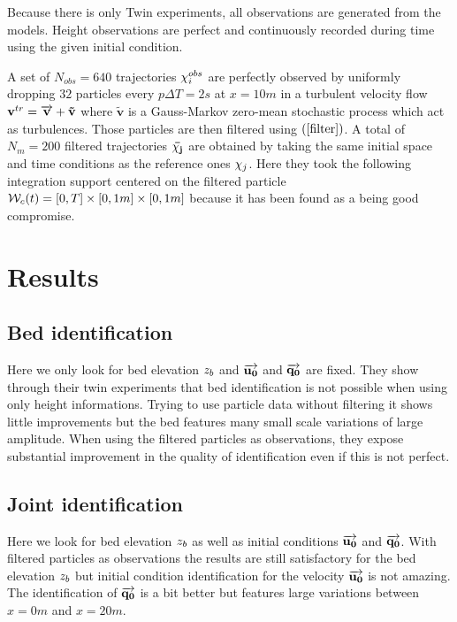 Because there is only Twin experiments, all observations are generated from the models.
Height observations are perfect and continuously recorded during time using the given initial condition.

\vskip 0.3cm
A set of $N_{obs} = 640$ trajectories $\mathbf{\chi}_i^{obs}$ are perfectly observed by uniformly dropping $32$ particles every $p\Delta T = 2s$ at $x = 10m$ in a turbulent velocity flow $\mathbf{v}^{tr} = \overrightarrow{\mathbf{v}} + \mathbf{\tilde{v}}$ where $\mathbf{\tilde{v}}$ is a Gauss-Markov zero-mean stochastic process which act as turbulences. 
Those particles are then filtered using $(\ref{filter})$. A total of $N_m = 200$ filtered trajectories $\mathbf{\bar{\chi_j}}$ are obtained by taking the same initial space and time conditions as the reference ones $\mathbf{\chi}_j$. Here they took the following integration support centered on the filtered particle $\mathcal{W}_c(t) = [0,T] \times [0,1m] \times [0,1m]$ because it has been found as a being good compromise.


\clearpage

\section{Results}
\subsection{Bed identification}
    
Here we only look for bed elevation $z_b$ and $\overrightarrow{\mathbf{u_0}}$ and $\overrightarrow{\mathbf{q_0}}$ are fixed.
They show through their twin experiments that bed identification is not possible when using only height informations. 
Trying to use particle data without filtering it shows little improvements but the bed features many small scale variations of large amplitude.
When using the filtered particles as observations, they expose substantial improvement in the quality of identification even if this is not perfect.

\subsection{Joint identification}
    
Here we look for bed elevation $z_b$ as well as initial conditions $\overrightarrow{\mathbf{u_0}}$ and $\overrightarrow{\mathbf{q_0}}$.
With filtered particles as observations the results are still satisfactory for the bed elevation $z_b$ but initial condition identification for the velocity $\overrightarrow{\mathbf{u_0}}$ is not amazing. The identification of $\overrightarrow{\mathbf{q_0}}$ is a bit better but features large variations between $x=0m$ and $x=20m$.

